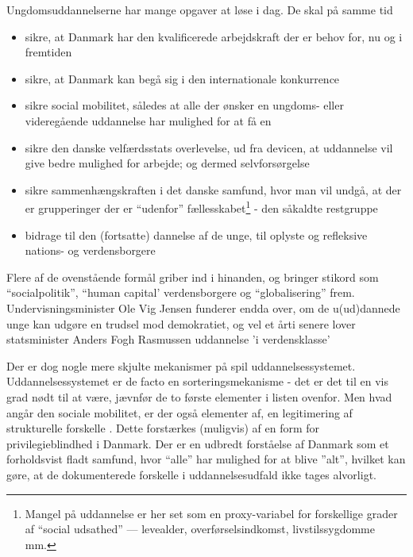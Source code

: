 Ungdomsuddannelserne har mange opgaver at løse i dag.
De skal på samme tid
\begin{itemize}
  \item
    sikre, at Danmark har den kvalificerede arbejdskraft der er behov for, nu og i fremtiden
  \item
    sikre, at Danmark kan begå sig i den internationale konkurrence
  \item
    sikre social mobilitet, således at alle der ønsker en ungdoms- eller videregående uddannelse har mulighed for at få en
  \item
    sikre den danske velfærdsstats overlevelse, ud fra devicen, at uddannelse vil give bedre mulighed for arbejde; og dermed selvforsørgelse 
  \item
    sikre sammenhængskraften i det danske samfund, hvor man vil undgå, at der er grupperinger der er “udenfor” fællesskabet\footnote{Mangel på uddannelse er her set som en proxy-variabel for forskellige grader af “social udsathed” — levealder, overførselsindkomst, livstilssygdomme mm.} - den såkaldte restgruppe
  \item
    bidrage til den (fortsatte) dannelse af de unge, til oplyste og refleksive nations- og verdensborgere
\end{itemize}

Flere af de ovenstående formål griber ind i hinanden, og bringer stikord som “socialpolitik”, “human capital' verdensborgere og “globalisering” frem.
Undervisningsminister Ole Vig Jensen funderer endda over, om de u(ud)dannede unge kan udgøre en trudsel mod demokratiet, og vel et årti senere lover statsminister Anders Fogh Rasmussen uddannelse 'i verdensklasse'

Der er dog nogle mere skjulte mekanismer på spil uddannelsessystemet.
Uddannelsessystemet er de facto en sorteringsmekanisme - det er det til en vis grad nødt til at være, jævnfør de to første elementer i listen ovenfor.
Men hvad angår den sociale mobilitet, er der også elementer af, en legitimering af strukturelle forskelle .
Dette forstærkes (muligvis) af en form for privilegieblindhed i Danmark.  
Der er en udbredt forståelse af Danmark som et forholdsvist fladt samfund, hvor “alle” har mulighed for at blive ”alt”, hvilket kan gøre, at de dokumenterede forskelle i uddannelsesudfald ikke tages alvorligt.


